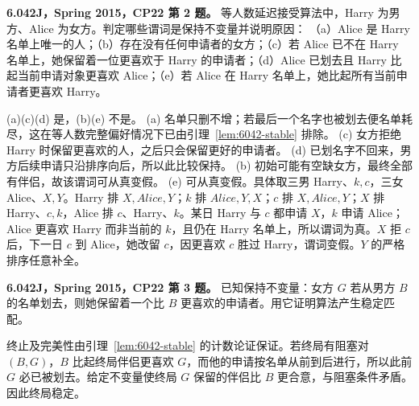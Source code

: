 \begin{exercise}\label{mit:6042-cp22-q2}
\textbf{6.042J，Spring 2015，CP22 第 2 题。}
等人数延迟接受算法中，Harry 为男方、Alice 为女方。判定哪些谓词是保持不变量并说明原因：
（a）Alice 是 Harry 名单上唯一的人；（b）存在没有任何申请者的女方；（c）若 Alice 已不在 Harry 名单上，她保留着一位更喜欢于 Harry 的申请者；（d）Alice 已划去且 Harry 比起当前申请对象更喜欢 Alice；（e）若 Alice 在 Harry 名单上，她比起所有当前申请者更喜欢 Harry。
\end{exercise}
\begin{solution}
(a)(c)(d) 是，(b)(e) 不是。
(a) 名单只删不增；若最后一个名字也被划去便名单耗尽，这在等人数完整偏好情况下已由引理~\ref{lem:6042-stable} 排除。
(c) 女方拒绝 Harry 时保留更喜欢的人，之后只会保留更好的申请者。
(d) 已划名字不回来，男方后续申请只沿排序向后，所以此比较保持。
(b) 初始可能有空缺女方，最终全部有伴侣，故该谓词可从真变假。
(e) 可从真变假。具体取三男 Harry、$k,c$，三女 Alice、$X,Y$。Harry 排 $X,Alice,Y$；$k$ 排 $Alice,Y,X$；$c$ 排 $X,Alice,Y$；$X$ 排 Harry、$c,k$，Alice 排 $c$、Harry、$k$。某日 Harry 与 $c$ 都申请 $X$，$k$ 申请 Alice；Alice 更喜欢 Harry 而非当前的 $k$，且仍在 Harry 名单上，所以谓词为真。$X$ 拒 $c$ 后，下一日 $c$ 到 Alice，她改留 $c$，因更喜欢 $c$ 胜过 Harry，谓词变假。$Y$ 的严格排序任意补全。
\end{solution}

\begin{exercise}\label{mit:6042-cp22-q3}
\textbf{6.042J，Spring 2015，CP22 第 3 题。}
已知保持不变量：女方 $G$ 若从男方 $B$ 的名单划去，则她保留着一个比 $B$ 更喜欢的申请者。用它证明算法产生稳定匹配。
\end{exercise}
\begin{solution}
终止及完美性由引理~\ref{lem:6042-stable} 的计数论证保证。若终局有阻塞对 $(B,G)$，$B$ 比起终局伴侣更喜欢 $G$，而他的申请按名单从前到后进行，所以此前 $G$ 必已被划去。给定不变量使终局 $G$ 保留的伴侣比 $B$ 更合意，与阻塞条件矛盾。因此终局稳定。
\end{solution}


